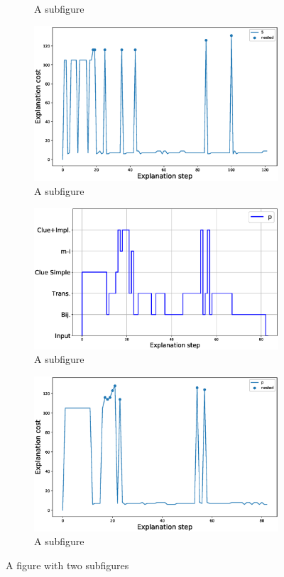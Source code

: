 \begin{figure}
\begin{subfigure}{.5\textwidth}
		\caption{A subfigure}
	\end{subfigure}%
	\begin{subfigure}{.5\textwidth}
		\centering
		\includegraphics[width=0.9\linewidth]{figures/5.eps}
		\caption{A subfigure}
	\end{subfigure}
	\begin{subfigure}{.5\textwidth}
		\centering
		\includegraphics[width=0.98\linewidth]{figures/plot_cost_steps_p.eps}
		\caption{A subfigure}
	\end{subfigure}%
	\begin{subfigure}{.5\textwidth}
		\centering
		\includegraphics[width=0.9\linewidth]{figures/p.eps}
		\caption{A subfigure}
	\end{subfigure}
	\caption{A figure with two subfigures}
	\label{fig:steps}
\end{figure}


